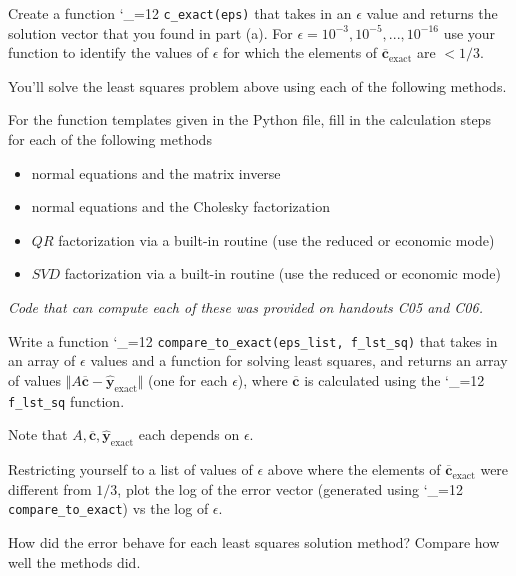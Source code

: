 \documentclass[12pt,letterpaper,noanswers]{exam}
\makeatletter
\newcommand{\pyf}{%
  \begingroup\catcode`_=12
  \pyf@
}
\newcommand{\pyf@}[1]{\texttt{#1}\endgroup}
\makeatother
\begin{document}
\begin{questions}
\begin{parts}
\item Create a function \pyf{c_exact(eps)} that takes in an $\epsilon$ value and returns the solution vector that you found in part (a).  For $\epsilon = 10^{-3}, 10^{-5},...,10^{-16}$ use your function to identify the values of $\epsilon$ for which the elements of $\overline{\mathbf{c}}_\text{exact}$ are $< 1/3$.


\end{parts}

You'll solve the least squares problem above using each of the following methods.

\begin{parts}
\setcounter{partno}{3}
\item For the function templates given in the Python file, fill in the calculation steps for each of the following methods
\begin{itemize}
    \item normal equations and the matrix inverse
    \item normal equations and the Cholesky factorization
    \item $QR$ factorization via a built-in routine (use the reduced or economic mode)
    \item $SVD$ factorization via a built-in routine (use the reduced or economic mode)
\end{itemize}

\emph{Code that can compute each of these was provided on handouts C05 and C06.}

\item Write a function \pyf{compare_to_exact(eps_list, f_lst_sq)} that takes in an array of $\epsilon$ values and a function for solving least squares, and returns an array of values $\Vert A\overline{\mathbf{c}} - \hat{\mathbf{y}}_{\text{exact}}\Vert$ (one for each $\epsilon$), where $\overline{\mathbf{c}}$ is calculated using the \pyf{f_lst_sq} function.

Note that $A, \overline{\mathbf{c}}, \hat{\mathbf{y}}_{\text{exact}}$ each depends on $\epsilon$.


\item 
Restricting yourself to a list of values of $\epsilon$ above where the elements of $\overline{\mathbf{c}}_\text{exact}$ were different from $1/3$, plot the log of the error vector (generated using \pyf{compare_to_exact}) vs the log of $\epsilon$.

\item How did the error behave for each least squares solution method?  Compare how well the methods did.


\end{parts}
\end{questions}
\end{document}
